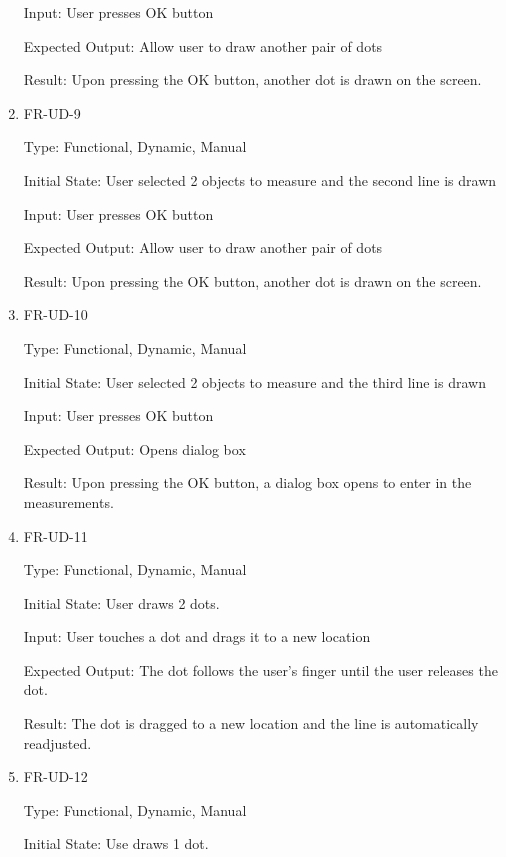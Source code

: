 \documentclass[12pt, titlepage]{article}
\begin{document}
\begin{enumerate}
					Input: User presses OK button
					
					Expected Output: Allow user to draw another pair of dots
					
					Result: Upon pressing the OK button, another dot is drawn on the screen.

\item{FR-UD-9\\}
					
					Type: Functional, Dynamic, Manual
					
					Initial State: User selected 2 objects to measure and the second line is drawn
					
					Input: User presses OK button
					
					Expected Output: Allow user to draw another pair of dots
					
					Result: Upon pressing the OK button, another dot is drawn on the screen.
				
\item{FR-UD-10\\}
					
					Type: Functional, Dynamic, Manual
					
					Initial State: User selected 2 objects to measure and the third line is drawn
					
					Input: User presses OK button
					
					Expected Output: Opens dialog box
					
					Result: Upon pressing the OK button, a dialog box opens to enter in the measurements. 

\item{FR-UD-11\\}
					
					Type: Functional, Dynamic, Manual
					
					Initial State: User draws 2 dots.
					
					Input: User touches a dot and drags it to a new location
					
					Expected Output: The dot follows the user's finger until the user releases the dot.
					
					Result: The dot is dragged to a new location and the line is automatically readjusted.


\item{FR-UD-12\\}
					
					Type: Functional, Dynamic, Manual
					
					Initial State: Use draws 1 dot.
					

\end{enumerate}
\end{document}
